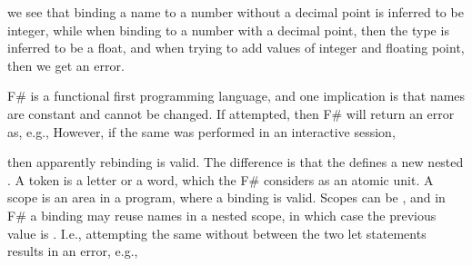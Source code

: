 




%
we see that binding a name to a number without a decimal point is inferred to be integer, while when binding to a number with a decimal point, then the type is inferred to be a float, and when trying to add values of integer and floating point, then we get an error.

F\# is a functional first programming language, and one implication is that names are constant and cannot be changed. If attempted, then F\# will return an error as, e.g., 
%
%
However, if the same was performed in an interactive session,
%



%
then apparently rebinding is valid. The difference is that the \idx{\token{;;}}  defines a new nested . A token is a letter or a word, which the F\# considers as an atomic unit. A scope is an area in a program, where a binding is valid. Scopes can be , and in F\# a binding may reuse names in a nested scope, in which case the previous value is . I.e., attempting the same without \token{;;} between the two let statements results in an error, e.g.,
%


